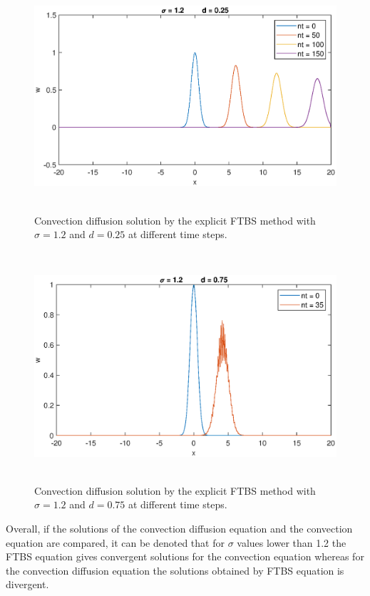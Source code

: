 \documentclass[letterpaper,12pt]{article}
\begin{document}
\begin{figure}[!ht] 
	\centering 
	\includegraphics[max height=8.5cm]{graphs/FTBS/ConvectionDiffusion/sigma12d025.eps}
	\caption{Convection diffusion solution by the explicit FTBS method with $\sigma= 1.2$ and $d=0.25$ at different time steps.}
	 \label{fig:FTBSsigma12d025}
\end{figure}
\newpage
\begin{figure}[!ht] 
	\centering 
	\includegraphics[max height=8.5cm]{graphs/FTBS/ConvectionDiffusion/sigma12d075.eps}
	\caption{Convection diffusion solution by the explicit FTBS method with $\sigma= 1.2$ and $d=0.75$ at different time steps.}
	 \label{fig:FTBSsigma12d075}
\end{figure}

Overall, if the solutions of the convection diffusion equation and the convection equation are
compared, it can be denoted that for $\sigma$ values lower than 1.2 the FTBS equation gives convergent
solutions for the convection equation whereas for the convection diffusion equation the solutions
obtained by FTBS equation is divergent.
\end{document}
